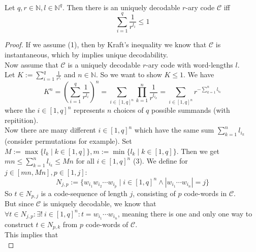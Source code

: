 \documentclass[12pt]{article}
\newenvironment{statement3}[3]{\begin{trivlist}
\item[\hskip \labelsep {\bfseries #1}\hskip \labelsep {\bfseries #2} {#3}\textbf{.}]}{\end{trivlist}}
\begin{document}
\begin{statement3}{(1.8)}{Theorem}{(McMillan's Inequality)}\strut\\[2pt]
    Let $q,r \in \mathbb{N}, l \in \mathbb{N}^q$. Then there is an uniquely decodable
    $r$-ary code $\mathcal{C}$ iff
    \begin{equation}
        \sum_{i=1}^{q} \frac{1}{r^{l_i}} \leq 1 \tag{1}
    \end{equation}

    \begin{proof}
        If we assume (1), then by Kraft's inequality we know that $\mathcal{C}$
        is instantaneous, which by \cite{ICT} implies unique decodability.\\[10pt]
        Now assume that $\mathcal{C}$ is a uniquely decodable $r$-ary code with word-lengths
        $l$.\\
        Let
        $
            K := \sum_{i=1}^{q} \frac{1}{r^{l_i}}
        $ and $n \in \mathbb{N}$. So we want to show $K \leq 1$.
        We have
        \begin{equation}
            K^n
            = \left(\sum_{i=1}^{q} \frac{1}{r^{l_i}}\right)^n
            = \sum_{i \in [1,q]^n}\prod_{k=1}^{n} \frac{1}{r^{l_{i_k}}}
            = \sum_{i \in [1,q]^n} r^{-\sum_{k=1}^{n} l_{i_k}} \tag{2}
        \end{equation}
        where the $i \in [1,q]^n$ represents $n$ choices of $q$ possible summands (with repitition).\\[10pt]
        Now there are many different $i \in [1,q]^n$ which have the same sum $\sum_{k=1}^{n} l_{i_k}$
        (consider permutations for example). Set $M := \max\{l_k\mid k \in [1,q]\}, m := \min\{l_k \mid k \in [1,q]\}$.
        Then we get $mn \leq \sum_{k=1}^{n} l_{i_k} \leq Mn$ for all $i \in [1,q]^n$ (3). We define for
        $j \in [mn,Mn], p \in [1,j]$:
        $$
            N_{j,p} := \{w_{i_1}w_{i_2}\cdots w_{i_p} \mid i \in [1,q]^n \land |w_{i_1}\cdots w_{i_n}| = j \}
        $$
        So $t \in N_{p,j}$ is a code-sequence of length $j$, consisting of $p$ code-words in $\mathcal{C}$.\\
        But since $\mathcal{C}$ is uniquely decodable, we know that
        $
            \forall t \in N_{j,p}: \exists!\ i \in [1,q]^n: t = w_{i_1}\cdots w_{i_n}
        $,
        meaning there is one and only one way to construct $t \in N_{p,k}$ from $p$ code-words of $\mathcal{C}$.\\
        This implies that
        \begin{equation}

\end{equation}
\end{proof}
\end{statement3}
\end{document}
